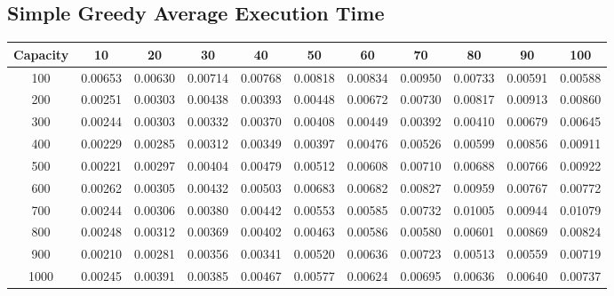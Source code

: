 \documentclass{article}
\begin{document}
\subsection{Simple Greedy Average Execution Time}
\begin{center}
\begin{tabular}{ccccccccccc}
\toprule
Capacity & 10 & 20 & 30 & 40 & 50 & 60 & 70 & 80 & 90 & 100 \\
\midrule
100 & 0.00653 & 0.00630 & 0.00714 & 0.00768 & 0.00818 & 0.00834 & 0.00950 & 0.00733 & 0.00591 & 0.00588 \\
200 & 0.00251 & 0.00303 & 0.00438 & 0.00393 & 0.00448 & 0.00672 & 0.00730 & 0.00817 & 0.00913 & 0.00860 \\
300 & 0.00244 & 0.00303 & 0.00332 & 0.00370 & 0.00408 & 0.00449 & 0.00392 & 0.00410 & 0.00679 & 0.00645 \\
400 & 0.00229 & 0.00285 & 0.00312 & 0.00349 & 0.00397 & 0.00476 & 0.00526 & 0.00599 & 0.00856 & 0.00911 \\
500 & 0.00221 & 0.00297 & 0.00404 & 0.00479 & 0.00512 & 0.00608 & 0.00710 & 0.00688 & 0.00766 & 0.00922 \\
600 & 0.00262 & 0.00305 & 0.00432 & 0.00503 & 0.00683 & 0.00682 & 0.00827 & 0.00959 & 0.00767 & 0.00772 \\
700 & 0.00244 & 0.00306 & 0.00380 & 0.00442 & 0.00553 & 0.00585 & 0.00732 & 0.01005 & 0.00944 & 0.01079 \\
800 & 0.00248 & 0.00312 & 0.00369 & 0.00402 & 0.00463 & 0.00586 & 0.00580 & 0.00601 & 0.00869 & 0.00824 \\
900 & 0.00210 & 0.00281 & 0.00356 & 0.00341 & 0.00520 & 0.00636 & 0.00723 & 0.00513 & 0.00559 & 0.00719 \\
1000 & 0.00245 & 0.00391 & 0.00385 & 0.00467 & 0.00577 & 0.00624 & 0.00695 & 0.00636 & 0.00640 & 0.00737 \\
\bottomrule
\end{tabular}
\end{center}
\end{document}
